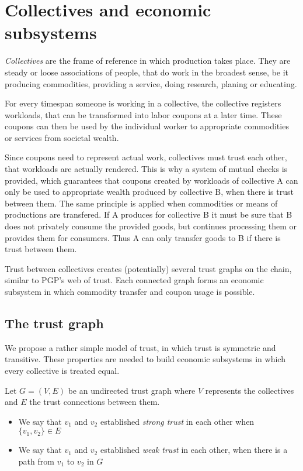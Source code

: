 \documentclass[11pt]{article}
\begin{document}
\section{Collectives and economic subsystems}

\emph{Collectives} are the frame of reference in which production takes place. They are steady or loose associations of people, that do work in the broadest sense, be it producing commodities, providing a service, doing research, planing or educating. 

For every timespan someone is working in a collective, the collective registers workloads, that can be transformed into labor coupons at a later time. These coupons can then be used by the individual worker to appropriate commodities or services from societal wealth.

Since coupons need to represent actual work, collectives must trust each other, that workloads are actually rendered. This is why a system of mutual checks is provided, which guarantees that coupons created by workloads of collective A can only be used to appropriate wealth produced by collective B, when there is trust between them. The same principle is applied when commodities or means of productions are transfered. If A produces for collective B it must be sure that B does not privately consume the provided goods, but continues processing them or provides them for consumers. Thus A can only transfer goods to B if there is trust between them.

Trust between collectives creates (potentially) several trust graphs on the chain, similar to PGP's web of trust. Each connected graph forms an economic subsystem in which commodity transfer and coupon usage is possible.

\subsection{The trust graph}

We propose a rather simple model of trust, in which trust is symmetric and transitive. These properties are needed to build economic subsystems in which every collective is treated equal. 

Let $G=(V, E)$ be an undirected trust graph where $V$ represents the collectives and $E$ the trust connections between them.

\begin{itemize}
\item We say that $v_1$ and $v_2$ established \emph{strong trust} in each other when $\{v_1, v_2\} \in E$
\item We say that $v_1$ and $v_2$ established \emph{weak trust} in each other, when there is a path from $v_1$ to $v_2$ in $G$
\end{itemize}
\end{document}
